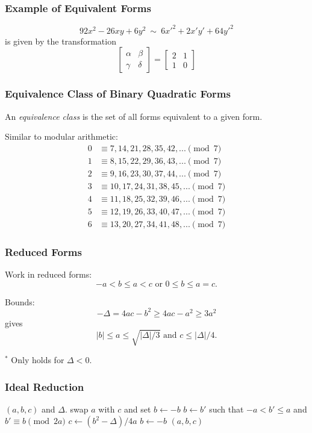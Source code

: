 \documentclass{beamer}
\newcommand{\matrixtt}[4]{\left[ \begin{array}{rr} #1 & #2 \\ #3 & #4 \end{array} \right]}
\newcommand{\smallfont}{\fontsize{6pt}{7.2}\selectfont}
\begin{document}
\begin{frame}
\frametitle{Example of Equivalent Forms}
\[
92x^2-26xy+6y^2 ~ \sim ~ 6{x'}^2+2x'y'+64{y'}^2
\]
is given by the transformation
\[
\matrixtt{\alpha}{\beta}{\gamma}{\delta} = \matrixtt{2}{1}{1}{0}
\]
\end{frame}

\begin{frame}
\frametitle{Equivalence Class of Binary Quadratic Forms}
An \emph{equivalence class} is the set of all forms equivalent to a given form.

\bigbreak
Similar to modular arithmetic:
\begin{align*}
0 &\equiv 7, 14, 21, 28, 35, 42, ... \pmod 7 \\
1 &\equiv 8, 15, 22, 29, 36, 43, ... \pmod 7 \\
2 &\equiv 9, 16, 23, 30, 37, 44, ... \pmod 7 \\
3 &\equiv 10, 17, 24, 31, 38, 45, ... \pmod 7 \\
4 &\equiv 11, 18, 25, 32, 39, 46, ... \pmod 7 \\
5 &\equiv 12, 19, 26, 33, 40, 47, ... \pmod 7 \\
6 &\equiv 13, 20, 27, 34, 41, 48, ... \pmod 7
\end{align*}
\end{frame}

\begin{frame}
\frametitle{Reduced Forms}
Work in reduced forms:
\[
-a < b \le a < c \textrm{ or } 0 \le b \le a = c.
\]

\bigbreak
Bounds:
\[
-\Delta = 4ac - b^2 \ge 4ac-a^2 \ge 3a^2
\]
gives
\[
|b| \le a \le \sqrt{|\Delta|/3} \textrm{ and } c \le |\Delta|/4.
\]

\bigbreak
\smallfont
${}^*$ Only holds for $\Delta < 0$.
\end{frame}

\begin{frame}
\frametitle{Ideal Reduction}
\begin{algorithmic}[1]
\Require $(a, b, c)$ and $\Delta$.
		\State swap $a$ with $c$ and set $b \gets -b$
	\EndIf
		\State $b \gets b'$ such that $-a < b' \le a$ and $b' \equiv b \pmod{2a}$
		\State $c \gets (b^2-\Delta)/4a$
	\EndIf
\EndWhile
{}
	\State $b \gets -b$
\EndIf
\State \Return $(a, b, c)$
\end{algorithmic}
\end{frame}
\end{document}

